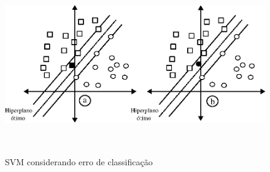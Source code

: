 \begin{figure}[hbt]
  \centering
  \caption{SVM considerando erro de classificação}
  \includegraphics[width=14cm,height=7cm]{./secoes/conceitosFundamentais/pics/img/VetoresDeSuporteSVM_casoNaoSeparavel.eps}
  \label{FIGURA_SVM_Caso_Nao_Separavel}
  \vspace{0.1cm}
\end{figure}

